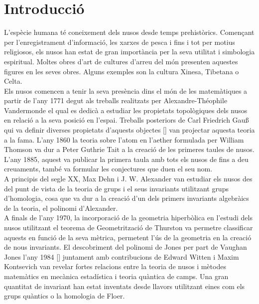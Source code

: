 \renewcommand{\figurename}{Figura}
\renewcommand{\proofname}{Demostració}
\newtheorem{definition}{Definició}
\newtheorem{theorem}{Teorema}
\newtheorem{proposition}{Proposició}
\newtheorem{corolary}{Corol·lari}
\newtheorem{lemma}{Lema}

\section{Introducció}\label{sec:Introducció}
L'espècie humana té coneixement dels nusos desde temps prehistòrics. Començant per l'enregistrament d'informació, les xarxes de pesca i fins i tot per motius religiosos, els nusos han estat de gran importància per la seva utilitat i simbologia espiritual. Moltes obres d'art de cultures d'arreu del món presenten aquestes figures en les seves obres. Alguns exemples son la cultura Xinesa, Tibetana o Celta.\\

Els nusos comencen a tenir la seva presència dins el món de les matemàtiques a partir de l'any 1771 degut als treballs realitzats per Alexandre-Théophile Vandermonde el qual es dedicà a estudiar les propietats topològiques dels nusos en relació a la seva posició en l'espai. Treballs posteriors de Carl Friedrich Gau\ss$ $ qui va definir diverses propietats d'aquests objectes [\cite{knottheory}] van projectar aquesta teoria a la fama. L'any 1860 la teoria sobre l'atom en l'aether formulada per William Thomson va dur a Peter Guthrie Tait a la creació de les primeres taules de nusos. L'any 1885, aquest va publicar la primera taula amb tots els nusos de fins a deu creuaments, també va formular les conjectures que duen el seu nom.\\

A principis del segle XX, Max Dehn i J. W. Alexander van estudiar els nusos des del punt de vista de la teoria de grups i el seus invariants utilitzant grups d'homologia, cosa que va dur a la creació d'un dels primers invariants algebràics de la teoria, el polinomi d'Alexander.\\

A finals de l'any 1970, la incorporació de la geometria hiperbòlica en l'estudi dels nusos utilitzant el teorema de Geometrització de Thurston va permetre classificar aquests en funció de la seva mètrica, permetent l'ús de la geometria en la creació de nous invariants. El descobriment del polinomi de Jones per part de Vaughan Jones l'any 1984 [\cite{mathwithatwist}] juntament amb contribucions de Edward Witten i Maxim Kontsevich van revelar fortes relacions entre la teoria de nusos i mètodes matemàtics en mecànica estadística i teoria quàntica de camps. Una gran quantitat de invariant han estat inventats desde llavors utilitzant eines com els grups quàntics o la homologia de Floer.\\

